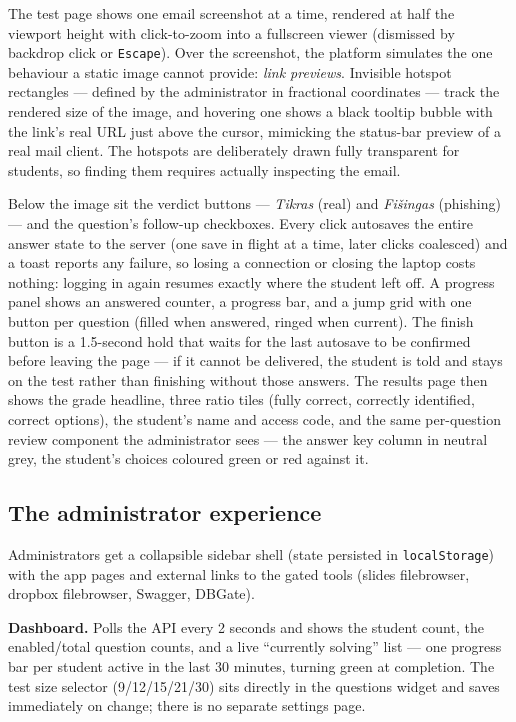 \documentclass[11pt,a4paper]{article}
\newcommand{\code}[1]{\texttt{#1}}
\begin{document}
The test page shows one email screenshot at a time, rendered at half
the viewport height with click-to-zoom into a fullscreen viewer
(dismissed by backdrop click or \code{Escape}). Over the screenshot,
the platform simulates the one behaviour a static image cannot
provide: \emph{link previews}. Invisible hotspot rectangles ---
defined by the administrator in fractional coordinates --- track the
rendered size of the image, and hovering one shows a black tooltip
bubble with the link's real URL just above the cursor, mimicking the
status-bar preview of a real mail client. The hotspots are
deliberately drawn fully transparent for students, so finding them
requires actually inspecting the email.

Below the image sit the verdict buttons --- \emph{Tikras} (real)
and \emph{Fišingas} (phishing) --- and the question's follow-up
checkboxes. Every click autosaves the entire answer state to the
server (one save in flight at a time, later clicks coalesced) and a
toast reports any failure, so losing a connection or closing the laptop
costs nothing: logging in again resumes exactly where the student left
off. A progress panel shows an answered counter, a progress bar, and a
jump grid with one button per question (filled when answered, ringed
when current). The finish button is a 1.5-second hold that waits for
the last autosave to be confirmed before leaving the page --- if it
cannot be delivered, the student is told and stays on the test rather
than finishing without those answers. The results page then shows the
grade headline,
three ratio tiles (fully correct, correctly identified, correct
options), the student's name and access code, and the same
per-question review component the administrator sees --- the answer
key column in neutral grey, the student's choices coloured green or
red against it.

\subsection{The administrator experience}
\label{sec:adminui}

Administrators get a collapsible sidebar shell (state persisted in
\code{localStorage}) with the app pages and external links to the
gated tools (slides filebrowser, dropbox filebrowser, Swagger,
DBGate).

\textbf{Dashboard.} Polls the API every 2 seconds and shows the
student count, the enabled/total question counts, and a live
``currently solving'' list --- one progress bar per student active in
the last 30 minutes, turning green at completion. The test size
selector (9/12/15/21/30) sits directly in the questions widget and
saves immediately on change; there is no separate settings page.
\end{document}
